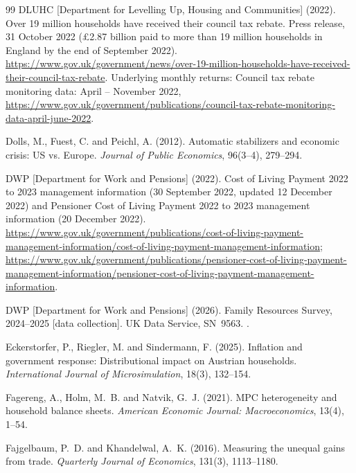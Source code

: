 \begin{thebibliography}{99}
DLUHC [Department for Levelling Up, Housing and Communities] (2022).
\newblock Over 19 million households have received their council tax rebate.
\newblock Press release, 31 October 2022 (\pounds 2.87 billion paid to more than 19 million households in England by the end of September 2022). \url{https://www.gov.uk/government/news/over-19-million-households-have-received-their-council-tax-rebate}. Underlying monthly returns: Council tax rebate monitoring data: April -- November 2022, \url{https://www.gov.uk/government/publications/council-tax-rebate-monitoring-data-april-june-2022}.

Dolls, M., Fuest, C. and Peichl, A. (2012).
\newblock Automatic stabilizers and economic crisis: US vs. Europe.
\newblock \emph{Journal of Public Economics}, 96(3--4), 279--294.

DWP [Department for Work and Pensions] (2022).
\newblock Cost of Living Payment 2022 to 2023 management information (30 September 2022, updated 12 December 2022) and Pensioner Cost of Living Payment 2022 to 2023 management information (20 December 2022).
\newblock \url{https://www.gov.uk/government/publications/cost-of-living-payment-management-information/cost-of-living-payment-management-information}; \url{https://www.gov.uk/government/publications/pensioner-cost-of-living-payment-management-information/pensioner-cost-of-living-payment-management-information}.

DWP [Department for Work and Pensions] (2026).
\newblock Family Resources Survey, 2024--2025 [data collection].
\newblock UK Data Service, SN~9563. .

Eckerstorfer, P., Riegler, M. and Sindermann, F. (2025).
\newblock Inflation and government response: Distributional impact on Austrian households.
\newblock \emph{International Journal of Microsimulation}, 18(3), 132--154.

Fagereng, A., Holm, M.~B. and Natvik, G.~J. (2021).
\newblock MPC heterogeneity and household balance sheets.
\newblock \emph{American Economic Journal: Macroeconomics}, 13(4), 1--54.

Fajgelbaum, P.~D. and Khandelwal, A.~K. (2016).
\newblock Measuring the unequal gains from trade.
\newblock \emph{Quarterly Journal of Economics}, 131(3), 1113--1180.


\end{thebibliography}

